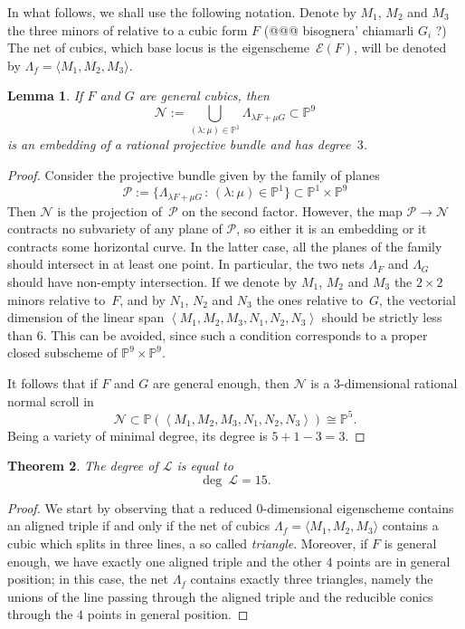 \documentclass{amsart}
\theoremstyle{plain}
\newtheorem{lemma}{Lemma}[section]
\newtheorem{theorem}[lemma]{Theorem}
\theoremstyle{definition}
\newcommand{\p}{\mathbb{P}}
\newcommand{\Eig}[1]{\mathcal{E}\!\left( {#1} \right)}
\begin{document}
{In what follows, we shall use the following notation.
Denote by $M_1$, $M_2$ and $M_3$ the three minors of  relative to a cubic form $F$ (@@@ bisognera' chiamarli $G_i$ ?)
The net of cubics, which base locus is the eigenscheme~$\Eig{F}$, will be denoted by $\Lambda_f = \langle M_1, M_2, M_3 \rangle$.
\begin{lemma}
\label{lemma:scroll}
 If $F$ and $G$ are general cubics, then
 \[
   \mathcal{N} := \bigcup_{(\lambda : \mu) \in \p^1} \Lambda_{\lambda F + \mu G} \subset \p^9
 \]
 is an embedding of a rational projective bundle and has degree~$3$.
\end{lemma}
\begin{proof}
Consider the projective bundle given by the family of planes
%
\[
{\mathcal P} := \{ \Lambda_{\lambda F + \mu G} \, : \, (\lambda: \mu)\in \p^1 \} \subset \p^1 \times \p^9
\]
%
Then $\mathcal{N}$ is the projection of~$\mathcal{P}$ on the second factor.
However, the map ${\mathcal P} \to {\mathcal N}$ contracts no subvariety of any plane of ${\mathcal P}$, so either it is an embedding or it contracts some horizontal curve. In the latter case, all the planes of the family should intersect in at least one point. In particular, the two nets $\Lambda_F$ and $\Lambda_G$ should have non-empty intersection.
If we denote by $M_1$, $M_2$ and $M_3$ the $2 \times 2$ minors relative to~$F$, and by $N_1$, $N_2$ and $N_3$ the ones relative to~$G$, the vectorial dimension of the linear span $\left\langle M_1, M_2, M_3, N_1, N_2, N_3 \right\rangle$ should be strictly less than $6$. This can be avoided, since such a condition corresponds to a proper closed subscheme of $\p^9 \times \p^9$.

It follows that if $F$ and $G$ are general enough, then $\mathcal{N}$ is a $3$-dimensional rational normal scroll in $$
\mathcal{N} \subset \p(\left\langle M_1, M_2, M_3, N_1, N_2, N_3 \right\rangle) \cong \p^5.
$$
Being a variety of minimal degree, its degree is $5+1-3 = 3$.
\end{proof}

\begin{theorem}
The degree of $\mathcal L$ is equal to
\[
  \deg \ \mathcal L =  15.
\]
\end{theorem}

\begin{proof}
We start by observing that a reduced $0$-dimensional eigenscheme contains an aligned triple if and only if the net of cubics $\Lambda_f = \langle M_1, M_2, M_3 \rangle$ contains a cubic which splits in three lines, a so called \emph{triangle}. Moreover, if $F$ is general enough, we have exactly one aligned triple and the other $4$ points are in general position; in this case, the net $\Lambda_f$ contains exactly three triangles, namely the unions of the line passing through the aligned triple and the reducible conics through the $4$ points in general position.


\end{proof}}
\end{document}
